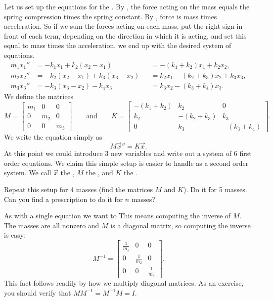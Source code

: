 Let us set up the equations for the .
By , the force acting on the mass equals the 
spring compression times the spring constant.  By
,
force is mass times acceleration.  So if we sum the forces acting
on each mass, put the right sign in front of each term, depending on the
direction in which it is acting, and set this equal to mass
times the acceleration, we end up with the desired system of
equations.
\begin{equation*}
\begin{aligned}
m_1 x_1'' &= -k_1 x_1 + k_2 (x_2-x_1)
& & = -(k_1+k_2) x_1 + k_2 x_2 , \\
m_2 x_2'' &= -k_2 (x_2-x_1) + k_3 (x_3-x_2)
& & = k_2 x_1 -(k_2+k_3) x_2 + k_3 x_3 , \\
m_3 x_3'' &= -k_3 (x_3-x_2) - k_4 x_3
& & = k_3 x_2 - (k_3+k_4) x_3 . 
\end{aligned}
\end{equation*}
We define the matrices
\begin{equation*}
M =
\begin{bmatrix}
m_1 & 0 & 0 \\
0 & m_2 & 0 \\
0 & 0 & m_3
\end{bmatrix}
\qquad
\text{and}
\qquad
K =
\begin{bmatrix}
-(k_1+k_2) & k_2 & 0 \\
k_2 & -(k_2+k_3) & k_3 \\
0 & k_3 & -(k_3+k_4)
\end{bmatrix} .
\end{equation*}
We write the equation simply as
\begin{equation*}
M {\vec{x}}'' = K \vec{x} .
\end{equation*}
At this point we could introduce 3 new variables and write out a system
of 6 first order equations.  We claim this simple setup is easier to handle as
a second order system.
We call $\vec{x}$ the \emph{}, $M$ the
\emph{}, and $K$ the \emph{}.

\begin{exercise}
Repeat this setup for 4 masses (find the matrices $M$ and $K$).
Do it for 5 masses.  Can you
find a prescription to do it for $n$ masses?
\end{exercise}

As with a single equation we want to   This means
computing the inverse of $M$.
The masses are all nonzero and $M$ is a
diagonal matrix, so computing the inverse
is easy:
\begin{equation*}
M^{-1} =
\begin{bmatrix}
\frac{1}{m_1} & 0 & 0 \\
0 & \frac{1}{m_2} & 0 \\
0 & 0 & \frac{1}{m_3}
\end{bmatrix} .
\end{equation*}
This fact follows readily
by how we multiply diagonal matrices.  As an exercise, you should verify that
$M M^{-1} = M^{-1} M = I$.

